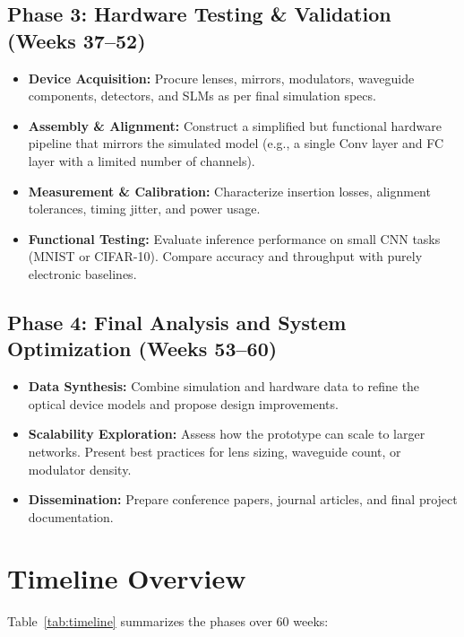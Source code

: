 \documentclass[conference]{IEEEtran}
\begin{document}
\subsection{Phase 3: Hardware Testing \& Validation (Weeks 37--52)}
\begin{itemize}
    \item \textbf{Device Acquisition:} Procure lenses, mirrors, modulators, waveguide components, detectors, and SLMs as per final simulation specs.
    \item \textbf{Assembly \& Alignment:} Construct a simplified but functional hardware pipeline that mirrors the simulated model (e.g., a single Conv layer and FC layer with a limited number of channels).
    \item \textbf{Measurement \& Calibration:} Characterize insertion losses, alignment tolerances, timing jitter, and power usage.
    \item \textbf{Functional Testing:} Evaluate inference performance on small CNN tasks (MNIST or CIFAR-10). Compare accuracy and throughput with purely electronic baselines.
\end{itemize}

\subsection{Phase 4: Final Analysis and System Optimization (Weeks 53--60)}
\begin{itemize}
    \item \textbf{Data Synthesis:} Combine simulation and hardware data to refine the optical device models and propose design improvements.
    \item \textbf{Scalability Exploration:} Assess how the prototype can scale to larger networks. Present best practices for lens sizing, waveguide count, or modulator density.
    \item \textbf{Dissemination:} Prepare conference papers, journal articles, and final project documentation.
\end{itemize}

\section{Timeline Overview}
Table~\ref{tab:timeline} summarizes the phases over 60 weeks:
\end{document}

